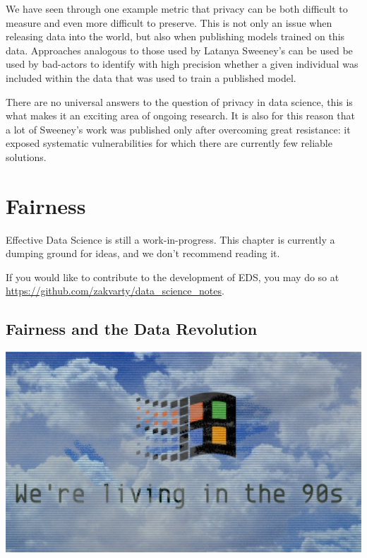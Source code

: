 \documentclass[
  12pt,
]{book}
\begin{document}
We have seen through one example metric that privacy can be both difficult to measure and even more difficult to preserve. This is not only an issue when releasing data into the world, but also when publishing models trained on this data. Approaches analogous to those used by Latanya Sweeney's can be used be used by bad-actors to identify with high precision whether a given individual was included within the data that was used to train a published model.

There are no universal answers to the question of privacy in data science, this is what makes it an exciting area of ongoing research. It is also for this reason that a lot of Sweeney's work was published only after overcoming great resistance: it exposed systematic vulnerabilities for which there are currently few reliable solutions.

\hypertarget{ethics-fairness}{%
\chapter{Fairness}\label{ethics-fairness}}

Effective Data Science is still a work-in-progress. This chapter is currently a dumping ground for ideas, and we don't recommend reading it.

If you would like to contribute to the development of EDS, you may do so at \url{https://github.com/zakvarty/data_science_notes}.

\hypertarget{fairness-and-the-data-revolution}{%
\section{Fairness and the Data Revolution}\label{fairness-and-the-data-revolution}}

\begin{center}\includegraphics[width=1\linewidth]{images/502-ethics-fairness/90s-windows-wallpaper} \end{center}
\end{document}
